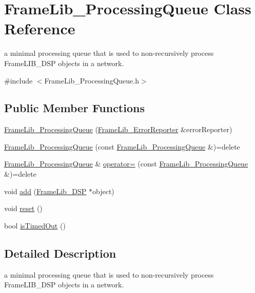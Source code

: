 \hypertarget{class_frame_lib___processing_queue}{}\section{Frame\+Lib\+\_\+\+Processing\+Queue Class Reference}
\label{class_frame_lib___processing_queue}


a minimal processing queue that is used to non-\/recursively process Frame\+L\+I\+B\+\_\+\+D\+SP objects in a network.  




{\ttfamily \#include $<$Frame\+Lib\+\_\+\+Processing\+Queue.\+h$>$}

\subsection*{Public Member Functions}
\begin{DoxyCompactItemize}
\item 
\hyperlink{class_frame_lib___processing_queue_a78a6230062203a2257260353053c30a4}{Frame\+Lib\+\_\+\+Processing\+Queue} (\hyperlink{class_frame_lib___error_reporter}{Frame\+Lib\+\_\+\+Error\+Reporter} \&error\+Reporter)
\item 
\hyperlink{class_frame_lib___processing_queue_aa41a1203cd7c47f1a27e97c56aed3683}{Frame\+Lib\+\_\+\+Processing\+Queue} (const \hyperlink{class_frame_lib___processing_queue}{Frame\+Lib\+\_\+\+Processing\+Queue} \&)=delete
\item 
\hyperlink{class_frame_lib___processing_queue}{Frame\+Lib\+\_\+\+Processing\+Queue} \& \hyperlink{class_frame_lib___processing_queue_a44a9ef734bc91efcee0bb95188e89e62}{operator=} (const \hyperlink{class_frame_lib___processing_queue}{Frame\+Lib\+\_\+\+Processing\+Queue} \&)=delete
\item 
void \hyperlink{class_frame_lib___processing_queue_add4ce0ad0a1cc32eb2df5522adea7e62}{add} (\hyperlink{class_frame_lib___d_s_p}{Frame\+Lib\+\_\+\+D\+SP} $\ast$object)
\item 
void \hyperlink{class_frame_lib___processing_queue_a5550993e0c39bb9d6075fdf6d5aec956}{reset} ()
\item 
bool \hyperlink{class_frame_lib___processing_queue_a2d82a4d810794436e31e02ff54904f6f}{is\+Timed\+Out} ()
\end{DoxyCompactItemize}


\subsection{Detailed Description}
a minimal processing queue that is used to non-\/recursively process Frame\+L\+I\+B\+\_\+\+D\+SP objects in a network. 

